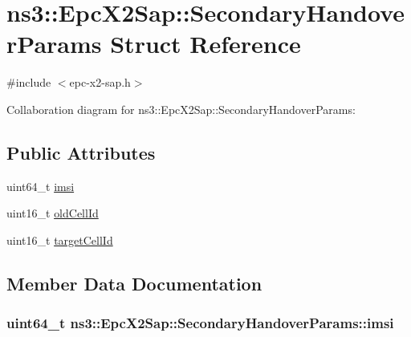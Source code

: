 \hypertarget{structns3_1_1EpcX2Sap_1_1SecondaryHandoverParams}{}\section{ns3\+:\+:Epc\+X2\+Sap\+:\+:Secondary\+Handover\+Params Struct Reference}
\label{structns3_1_1EpcX2Sap_1_1SecondaryHandoverParams}


{\ttfamily \#include $<$epc-\/x2-\/sap.\+h$>$}



Collaboration diagram for ns3\+:\+:Epc\+X2\+Sap\+:\+:Secondary\+Handover\+Params\+:
\subsection*{Public Attributes}
\begin{DoxyCompactItemize}
\item 
uint64\+\_\+t \hyperlink{structns3_1_1EpcX2Sap_1_1SecondaryHandoverParams_afdfd0c6e336b0a7d9227cc01bf3851f9}{imsi}
\item 
uint16\+\_\+t \hyperlink{structns3_1_1EpcX2Sap_1_1SecondaryHandoverParams_a0c1239c9d49a4403206fa1f7626386aa}{old\+Cell\+Id}
\item 
uint16\+\_\+t \hyperlink{structns3_1_1EpcX2Sap_1_1SecondaryHandoverParams_a4e9b254b153f3a047b8b818d224dd002}{target\+Cell\+Id}
\end{DoxyCompactItemize}


\subsection{Member Data Documentation}
\subsubsection[{\texorpdfstring{imsi}{imsi}}]{\setlength{\rightskip}{0pt plus 5cm}uint64\+\_\+t ns3\+::\+Epc\+X2\+Sap\+::\+Secondary\+Handover\+Params\+::imsi}\hypertarget{structns3_1_1EpcX2Sap_1_1SecondaryHandoverParams_afdfd0c6e336b0a7d9227cc01bf3851f9}{}\label{structns3_1_1EpcX2Sap_1_1SecondaryHandoverParams_afdfd0c6e336b0a7d9227cc01bf3851f9}
